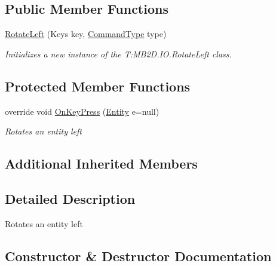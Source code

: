 \subsection*{Public Member Functions}
\begin{DoxyCompactItemize}
\item 
\hyperlink{class_m_b2_d_1_1_i_o_1_1_rotate_left_ad37b863a1e1b7256dfe27f61d606156b}{Rotate\+Left} (Keys key, \hyperlink{namespace_m_b2_d_1_1_i_o_ab5f95f3fe9e652778b62bdf943168a68}{Command\+Type} type)
\begin{DoxyCompactList}\small\item\em Initializes a new instance of the T\+:\+M\+B2\+D.\+I\+O.\+Rotate\+Left class. \end{DoxyCompactList}\end{DoxyCompactItemize}
\subsection*{Protected Member Functions}
\begin{DoxyCompactItemize}
\item 
override void \hyperlink{class_m_b2_d_1_1_i_o_1_1_rotate_left_adf98596b3689a88aaf1334e00b548443}{On\+Key\+Press} (\hyperlink{class_m_b2_d_1_1_entity_component_1_1_entity}{Entity} e=null)
\begin{DoxyCompactList}\small\item\em Rotates an entity left \end{DoxyCompactList}\end{DoxyCompactItemize}
\subsection*{Additional Inherited Members}


\subsection{Detailed Description}
Rotates an entity left 



\subsection{Constructor \& Destructor Documentation}
\hypertarget{class_m_b2_d_1_1_i_o_1_1_rotate_left_ad37b863a1e1b7256dfe27f61d606156b}{}\label{class_m_b2_d_1_1_i_o_1_1_rotate_left_ad37b863a1e1b7256dfe27f61d606156b} 
